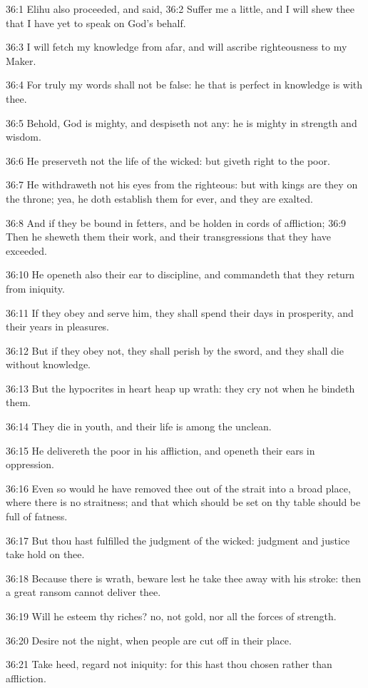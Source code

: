 36:1 Elihu also proceeded, and said, 36:2 Suffer me a little, and I will shew thee that I have yet to speak on God's behalf.

36:3 I will fetch my knowledge from afar, and will ascribe righteousness to my Maker.

36:4 For truly my words shall not be false: he that is perfect in knowledge is with thee.

36:5 Behold, God is mighty, and despiseth not any: he is mighty in strength and wisdom.

36:6 He preserveth not the life of the wicked: but giveth right to the poor.

36:7 He withdraweth not his eyes from the righteous: but with kings are they on the throne; yea, he doth establish them for ever, and they are exalted.

36:8 And if they be bound in fetters, and be holden in cords of affliction; 36:9 Then he sheweth them their work, and their transgressions that they have exceeded.

36:10 He openeth also their ear to discipline, and commandeth that they return from iniquity.

36:11 If they obey and serve him, they shall spend their days in prosperity, and their years in pleasures.

36:12 But if they obey not, they shall perish by the sword, and they shall die without knowledge.

36:13 But the hypocrites in heart heap up wrath: they cry not when he bindeth them.

36:14 They die in youth, and their life is among the unclean.

36:15 He delivereth the poor in his affliction, and openeth their ears in oppression.

36:16 Even so would he have removed thee out of the strait into a broad place, where there is no straitness; and that which should be set on thy table should be full of fatness.

36:17 But thou hast fulfilled the judgment of the wicked: judgment and justice take hold on thee.

36:18 Because there is wrath, beware lest he take thee away with his stroke: then a great ransom cannot deliver thee.

36:19 Will he esteem thy riches? no, not gold, nor all the forces of strength.

36:20 Desire not the night, when people are cut off in their place.

36:21 Take heed, regard not iniquity: for this hast thou chosen rather than affliction.

